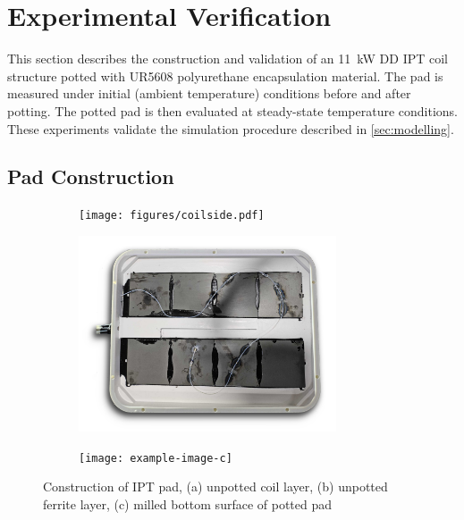 \documentclass[conference]{IEEEtran}
\begin{document}
\lipsum[2]

\section{Experimental Verification}
\label{sec:experiments}

This section describes the construction and validation of an \SI{11}{\kilo\watt} DD IPT coil structure potted with UR5608 polyurethane encapsulation material. 
The pad is measured under initial (ambient temperature) conditions before and after potting. 
The potted pad is then evaluated at steady-state temperature conditions. 
These experiments validate the simulation procedure described in \cref{sec:modelling}. 

\subsection{Pad Construction}

\begin{figure}
  \centering
  \begin{subfigure}{\columnwidth}
    \centering
    \texttt{[image: figures/coilside.pdf]}
    \caption{}
    \label{fig:coilside}
  \end{subfigure}
  \vspace{1em}

  \begin{subfigure}{\columnwidth}
    \centering
    \includegraphics[width=3in]{figures/ferriteside.pdf}
    \caption{}
    \label{fig:ferriteside}
  \end{subfigure}
  \vspace{1em}

  \begin{subfigure}{\columnwidth}
    \centering
    \texttt{[image: example-image-c]}
    \caption{}
    \label{fig:finalpad}
  \end{subfigure}

  \caption{Construction of IPT pad, (a) unpotted coil layer, (b) unpotted ferrite layer, (c) milled bottom surface of potted pad}
  \label{fig:padconstruction}
\end{figure}
\end{document}
